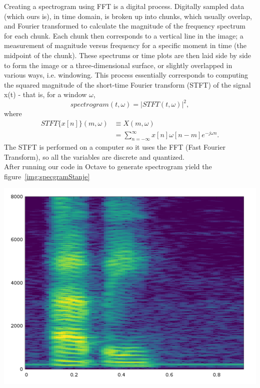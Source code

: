 \documentclass[twoside]{article}
\newenvironment{Figure}
  {\par\medskip\noindent\minipage{\linewidth}}
  {\endminipage\par\medskip}
\begin{document}
\begin{multicols}{2}
Creating a spectrogram using FFT is a digital process. Digitally sampled data (which ours is), in time domain, is broken up into chunks, which usually overlap, and Fourier transformed to calculate the magnitude of the frequency spectrum for each chunk. Each chunk then corresponds to a vertical line in the image; a measurement of magnitude versus frequency for a specific moment in time (the midpoint of the chunk). These spectrums or time plots are then laid side by side to form the image or a three-dimensional surface, or slightly overlapped in various ways, i.e. windowing. This process essentially corresponds to computing the squared magnitude of the short-time Fourier transform (STFT) of the signal x(t) - that is, for a window $\omega$,
\[ spectrogram(t,\omega)=|STFT(t,\omega)|^2 ,\]
where 
\begin{align*} STFT \lbrace x[n] \rbrace (m,\omega)&\equiv X(m,\omega) \\ 
&=\sum_{n=-\infty}^{\infty} x[n]\omega [n-m]e^{-j\omega n}.
\end{align*}
The STFT is performed on a computer so it uses the FFT (Fast Fourier Transform), so all the variables are discrete and quantized. \\
After running our code in Octave to generate spectrogram yield the figure~\ref{img:specgramStanje} \\
\begin{Figure}
	\centering
	\includegraphics[width=1.0\textwidth]{happy-specgram}
	\label{img:specgramStanje}
\end{Figure}

\end{multicols}
\end{document}
